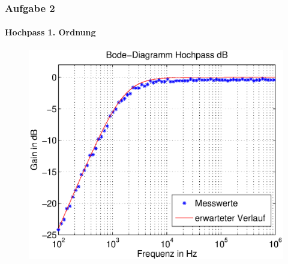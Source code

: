 \begin{frame}
    \frametitle{Aufgabe 2}
    \framesubtitle{Hochpass 1. Ordnung}
     \begin{figure}[H]
     \begin{center}
             \includegraphics[scale=0.6]{./img/2b_bode_hoch_dB.eps}
     \end{center}
     \end{figure}
\end{frame}
